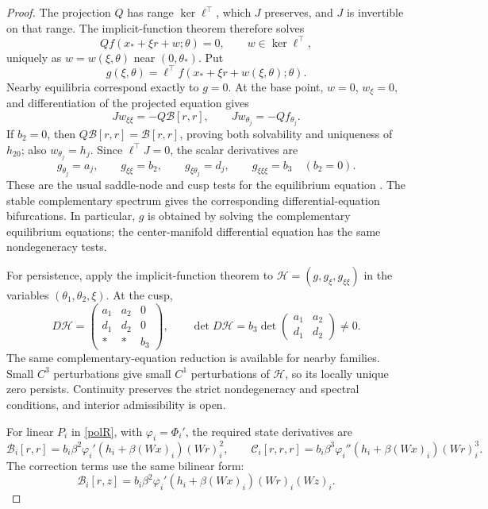 \begin{proof}
The projection $Q$ has range $\ker\ell^\top$, which $J$ preserves,
and $J$ is invertible on that range. The implicit-function theorem
therefore solves
\[
 Qf(x_*+\xi r+w;\theta)=0,\qquad w\in\ker\ell^\top,
\]
uniquely as $w=w(\xi,\theta)$ near $(0,\theta_*)$. Put
\[
 g(\xi,\theta)=\ell^\top
 f(x_*+\xi r+w(\xi,\theta);\theta).
\]
Nearby equilibria correspond exactly to $g=0$. At the base point,
$w=0$, $w_\xi=0$, and differentiation of the projected equation gives
\[
 Jw_{\xi\xi}=-Q\mathcal B[r,r],\qquad
 Jw_{\theta_j}=-Qf_{\theta_j}.
\]
If $b_2=0$, then $Q\mathcal B[r,r]=\mathcal B[r,r]$, proving both
solvability and uniqueness of $h_{20}$; also $w_{\theta_j}=h_j$.
Since $\ell^\top J=0$, the scalar derivatives are
\[
 g_{\theta_j}=a_j,\qquad g_{\xi\xi}=b_2,
 \qquad g_{\xi\theta_j}=d_j,
 \qquad g_{\xi\xi\xi}=b_3\quad(b_2=0).
\]
These are the usual saddle-node and cusp tests for the equilibrium equation
\cite{kuznetsov2004}. The stable complementary spectrum gives the
corresponding differential-equation bifurcations. In particular, $g$
is obtained by solving the complementary equilibrium equations; the
center-manifold differential equation has the same nondegeneracy tests.

For persistence, apply the implicit-function theorem to
$\mathcal H=(g,g_\xi,g_{\xi\xi})$ in the variables
$(\theta_1,\theta_2,\xi)$. At the cusp,
\[
 D\mathcal H=
 \begin{pmatrix}a_1&a_2&0\\d_1&d_2&0\\ *&*&b_3\end{pmatrix},
 \qquad
 \det D\mathcal H=b_3
 \det\begin{pmatrix}a_1&a_2\\d_1&d_2\end{pmatrix}\ne0.
\]
The same complementary-equation reduction is available for nearby
families. Small $C^3$ perturbations give small $C^1$ perturbations
of $\mathcal H$, so its locally unique zero persists. Continuity
preserves the strict nondegeneracy and spectral conditions, and
interior admissibility is open.

For linear $P_i$ in \eqref{polR}, with $\varphi_i=\Phi_i'$,
the required state derivatives are
\[
 \mathcal B_i[r,r]=b_i\beta^2\varphi_i'(h_i+\beta(Wx)_i)(Wr)_i^2,
 \qquad
 \mathcal C_i[r,r,r]=b_i\beta^3\varphi_i''(h_i+\beta(Wx)_i)(Wr)_i^3.
\]
The correction terms use the same bilinear form:
\[
 \mathcal B_i[r,z]
 =b_i\beta^2\varphi_i'(h_i+\beta(Wx)_i)(Wr)_i(Wz)_i.
\]
\end{proof}

